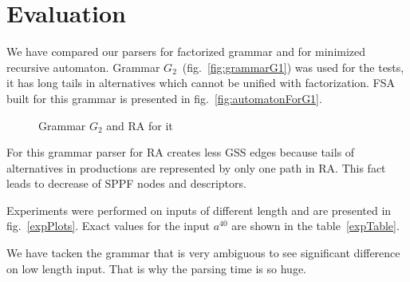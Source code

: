\documentclass[runningheads,a4paper]{llncs}
\begin{document}





\section{Evaluation}

We have compared our parsers for factorized grammar and for minimized recursive automaton.
Grammar $G_2$~(fig.~\ref{fig:grammarG1}) was used for the tests, it has long tails in alternatives which cannot be unified with factorization.
FSA built for this grammar is presented in fig.~\ref{fig:automatonForG1}.

\begin{figure}[ht]   
    \centering

    \caption{Grammar $G_2$ and RA for it}
\end{figure}

For this grammar parser for RA creates less GSS edges because tails of alternatives in productions
are represented by only one path in RA. This fact leads to decrease of SPPF nodes and descriptors.

Experiments were performed on inputs of different length and are presented in fig.~\ref{expPlots}.
Exact values for the input $a^{40}$ are shown in the table~\ref{expTable}.


We have tacken the grammar that is very ambiguous to see significant difference on low length input.
That is why the parsing time is so huge.
\end{document}
